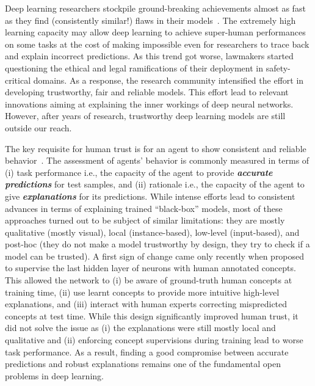 \documentclass[withindex,glossary]{cam-thesis}
\begin{document}
Deep learning researchers stockpile ground-breaking achievements almost as fast as they find (consistently similar!) flaws in their models~\citep{marcus2022very}. The extremely high learning capacity may allow deep learning to achieve super-human performances on some tasks at the cost of making impossible even for researchers to trace back and explain incorrect predictions. As this trend got worse, lawmakers started questioning the ethical and legal ramifications of their deployment in safety-critical domains. As a response, the research community intensified the effort in developing trustworthy, fair and reliable models. This effort lead to relevant innovations aiming at explaining the inner workings of deep neural networks. However, after years of research, trustworthy deep learning models are still outside our reach.

The key requisite for human trust is for an agent to show consistent and reliable behavior~\citep{shen2022trust}. The assessment of agents' behavior is commonly measured in terms of (i) task performance i.e., the capacity of the agent to provide \textbf{\textit{accurate predictions}} for test samples, and (ii) rationale i.e., the capacity of the agent to give \textbf{\textit{explanations}} for its predictions. While intense efforts lead to consistent advances in terms of explaining trained ``black-box'' models, most of these approaches turned out to be subject of similar limitations: they are mostly qualitative (mostly visual), local (instance-based), low-level (input-based), and post-hoc (they do not make a model trustworthy by design, they try to check if a model can be trusted). A first sign of change came only recently when \citet{koh2020concept} proposed to supervise the last hidden layer of neurons with human annotated concepts. This allowed the network to (i) be aware of ground-truth human concepts at training time, (ii) use learnt concepts to provide more intuitive high-level explanations, and (iii) interact with human experts correcting mispredicted concepts at test time. While this design significantly improved human trust, it did not solve the issue as (i) the explanations were still mostly local and qualitative and (ii) enforcing concept supervisions during training lead to worse task performance. As a result, finding a good compromise between accurate predictions and robust explanations remains one of the fundamental open problems in deep learning.
\end{document}
